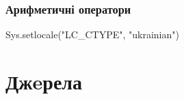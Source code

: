 \documentclass[
]{book}
\newenvironment{Shaded}{\begin{snugshade}}{\end{snugshade}}
\newcommand{\FunctionTok}[1]{\textcolor[rgb]{0.00,0.00,0.00}{#1}}
\newcommand{\NormalTok}[1]{#1}
\newcommand{\StringTok}[1]{\textcolor[rgb]{0.31,0.60,0.02}{#1}}
\begin{document}
\hypertarget{chapter231}{%
\subsection{Арифметичні оператори}\label{chapter231}}

\begin{Shaded}
\begin{Highlighting}[]
\FunctionTok{Sys.setlocale}\NormalTok{(}\StringTok{"LC\_CTYPE"}\NormalTok{, }\StringTok{"ukrainian"}\NormalTok{)}
\end{Highlighting}
\end{Shaded}

\hypertarget{ux434ux436eux440ux435ux43bux430}{%
\chapter*{Джeрела}\label{ux434ux436eux440ux435ux43bux430}}

  
\end{document}
